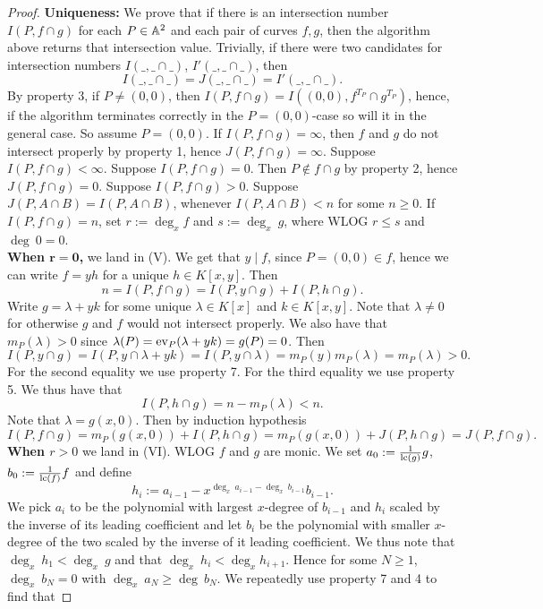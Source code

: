     \begin{proof}
        \textbf{Uniqueness:} We prove that if there is an intersection number $I(P,f\cap g)$ for each $P\in \mathbb{A}^2$ and each pair of curves $f,g$, then the algorithm above returns that intersection value. Trivially, if there were two candidates for intersection numbers $I(\_,\_\cap \_)$, $I'(\_,\_\cap \_)$, then 
        $$I(\_,\_\cap \_)=J(\_,\_\cap \_)=I'(\_,\_\cap \_).$$
        By property 3, if $P\neq (0,0)$, then $I(P,f\cap g)=I((0,0),f^{T_P}\cap g^{T_P})$, hence, if the algorithm terminates correctly in the $P=(0,0)$-case so will it in the general case. So assume $P=(0,0)$. If $I(P,f\cap g)=\infty$, then $f$ and $g$ do not intersect properly by property 1, hence $J(P,f\cap g)=\infty$. Suppose $I(P,f\cap g)<\infty$. Suppose $I(P,f\cap g)=0$. Then $P\notin f\cap g$ by property 2, hence $J(P,f\cap g)=0$. Suppose $I(P,f\cap g)>0$. Suppose $J(P,A\cap B)=I(P,A\cap B)$, whenever $I(P,A\cap B)<n$ for some $n\geq 0$. If $I(P,f\cap g)=n$, set $r:=\deg_x f$ and $s:=\deg_x\ g$, where WLOG $r\leq s$ and $\deg \ 0 = 0$.\\
        \textbf{When $\mathbf{r=0}$,} we land in (V). We get that $y\mid f$, since $P=(0,0)\in f$, hence we can write $f=yh$ for a unique $h\in K[x,y]$. Then 
        $$n=I(P, f\cap g )=I(P,y\cap g) + I(P, h\cap g).$$
        Write $g= \lambda+yk$ for some unique $\lambda\in K[x]$ and $k\in K[x,y]$. Note that $\lambda \neq 0$ for otherwise $g$ and $f$ would not intersect properly. We also have that $m_P(\lambda)>0$ since $\lambda(P)=\mathrm{ev}_P(\lambda+yk)=g(P)=0$. Then 
        $$I(P,y\cap g) = I(P,y\cap \lambda+yk)=I(P,y\cap\lambda)=m_P(y)m_P(\lambda)=m_P(\lambda)>0.$$
        For the second equality we use property 7. For the third equality we use property 5. We thus have that 
        $$I(P,h\cap g) =n-m_P(\lambda)<n.$$
        Note that $\lambda = g(x,0)$. Then by induction hypothesis
        $$I(P,f\cap g) = m_P(g(x,0))+I(P,h\cap g) = m_P(g(x,0))+J(P,h\cap g)=J(P,f\cap g).$$
        \textbf{When $r>0$} we land in (VI). WLOG $f$ and $g$ are monic. We set $a_0:= \frac{1}{\mathrm{lc}(g)}g$, $b_0:= \frac{1}{\mathrm{lc}(f)}f$ and define 
        $$h_i:= a_{i-1}-x^{\deg_x\ a_{i-1}-\deg_x \ b_{i-1}} b_{i-1}.$$
        We pick $a_i$ to be the polynomial with largest $x$-degree of $b_{i-1}$ and $h_i$ scaled by the inverse of its leading coefficient and let $b_i$ be the polynomial with smaller $x$-degree of the two scaled by the inverse of it leading coefficient. We thus note that $\deg_x \ h_1 < \deg_x \ g$ and that $\deg_x\ h_i < \deg_x h_{i+1}$. Hence for some $N\geq 1$, $\deg_x \ b_N = 0$ with $\deg_x\ a_N \geq \deg\ b_N$. We repeatedly use property 7 and 4 to find that 

\end{proof}
